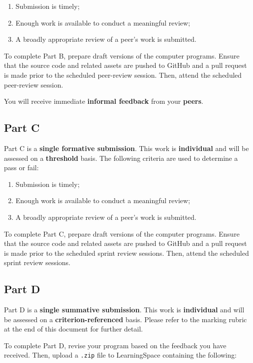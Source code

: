 \documentclass{../../fal_assignment}
\begin{document}
\begin{enumerate}[label=(\alph*)]
	\item Submission is timely;
	\item Enough work is available to conduct a meaningful review;
	\item A broadly appropriate review of a peer's work is submitted.
\end{enumerate}

To complete Part B, prepare draft versions of the computer programs. Ensure that the source code and related assets are pushed to GitHub and a pull request is made prior to the scheduled peer-review session. Then, attend the scheduled peer-review session.

You will receive immediate \textbf{informal feedback} from your \textbf{peers}.

\subsection*{Part C}

Part C is a \textbf{single formative submission}. This work is \textbf{individual} and will be assessed on a \textbf{threshold} basis. The following criteria are used to determine a pass or fail:

\begin{enumerate}[label=(\alph*)]
	\item Submission is timely;
	\item Enough work is available to conduct a meaningful review;
	\item A broadly appropriate review of a peer's work is submitted.
\end{enumerate}

To complete Part C, prepare draft versions of the computer programs. Ensure that the source code and related assets are pushed to GitHub and a pull request is made prior to the scheduled sprint review sessions. Then, attend the scheduled sprint review sessions.

\subsection*{Part D}

Part D is a \textbf{single summative submission}. This work is \textbf{individual} and will be assessed on a \textbf{criterion-referenced} basis. Please refer to the marking rubric at the end of this document for further detail.

To complete Part D, revise your program based on the feedback you have received. Then, upload a \texttt{.zip} file to LearningSpace containing the following:
\end{document}
